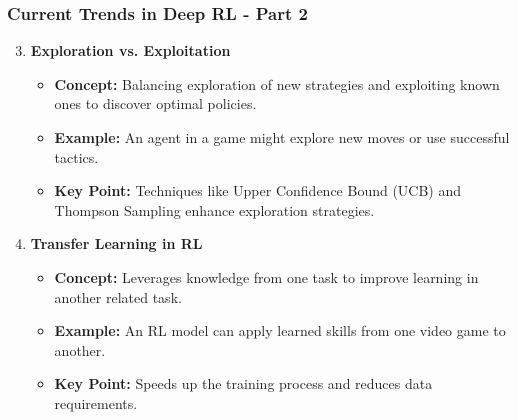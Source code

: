 \documentclass[aspectratio=169]{beamer}
\begin{document}
\begin{frame}[fragile]
  \frametitle{Current Trends in Deep RL - Part 2}
  \begin{enumerate}
    \setcounter{enumi}{2}
    \item \textbf{Exploration vs. Exploitation}
      \begin{itemize}
        \item \textbf{Concept:} Balancing exploration of new strategies and exploiting known ones to discover optimal policies.
        \item \textbf{Example:} An agent in a game might explore new moves or use successful tactics.
        \item \textbf{Key Point:} Techniques like Upper Confidence Bound (UCB) and Thompson Sampling enhance exploration strategies.
      \end{itemize}

    \item \textbf{Transfer Learning in RL}
      \begin{itemize}
        \item \textbf{Concept:} Leverages knowledge from one task to improve learning in another related task.
        \item \textbf{Example:} An RL model can apply learned skills from one video game to another.
        \item \textbf{Key Point:} Speeds up the training process and reduces data requirements.
      \end{itemize}
  \end{enumerate}
\end{frame}
\end{document}

